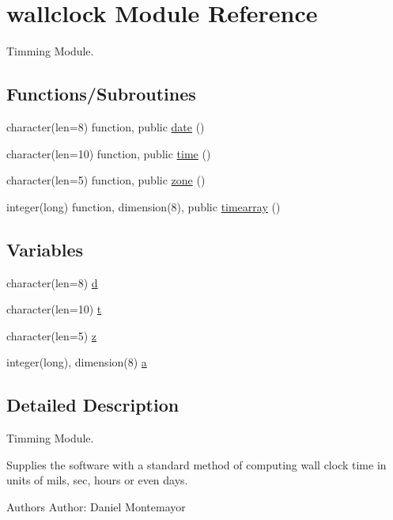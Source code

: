 \hypertarget{namespacewallclock}{}\section{wallclock Module Reference}
\label{namespacewallclock}


Timming Module.  


\subsection*{Functions/\+Subroutines}
\begin{DoxyCompactItemize}
\item 
character(len=8) function, public \hyperlink{namespacewallclock_aac2bc47e557d4981f481295bd687dd50}{date} ()
\item 
character(len=10) function, public \hyperlink{namespacewallclock_a3efb3d12447df7568e0b22b3cd4ed60d}{time} ()
\item 
character(len=5) function, public \hyperlink{namespacewallclock_ac6bdcdd3cf7fc38f4c738862e2a82dac}{zone} ()
\item 
integer(long) function, dimension(8), public \hyperlink{namespacewallclock_ac691a026a7b92c6cd971e86d0449d42b}{timearray} ()
\end{DoxyCompactItemize}
\subsection*{Variables}
\begin{DoxyCompactItemize}
\item 
character(len=8) \hyperlink{namespacewallclock_a0922e57a4f1a99af864f31246c132d4c}{d}
\item 
character(len=10) \hyperlink{namespacewallclock_a8a94eeecb39db73f1c36c9b00a95c9f7}{t}
\item 
character(len=5) \hyperlink{namespacewallclock_a47a8e5d4efccd0142b0587c873dad88b}{z}
\item 
integer(long), dimension(8) \hyperlink{namespacewallclock_a634d56ca30b98ea804c6d33a0a635ec0}{a}
\end{DoxyCompactItemize}


\subsection{Detailed Description}
Timming Module. 

Supplies the software with a standard method of computing wall clock time in units of mils, sec, hours or even days. \begin{DoxyAuthor}{Authors}
Author\+: Daniel Montemayor 
\end{DoxyAuthor}


